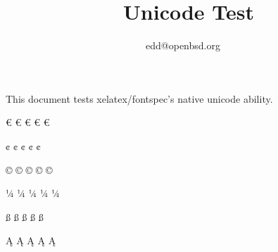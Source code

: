 \documentclass{article}
\begin{document}
\title{\XeLaTeX\ Unicode Test}
\author{edd@openbsd.org}

\maketitle

This document tests xelatex/fontspec's native unicode ability.

\newcommand{\testglyph}[1]{%
	#1 {\large #1} {\Large #1} {\huge #1} {\Huge #1}\newline%
}
	
\noindent\testglyph{€}
\testglyph{¢}
\testglyph{©}
\testglyph{¼}
\testglyph{ß}
\testglyph{Ą}
\end{document}
